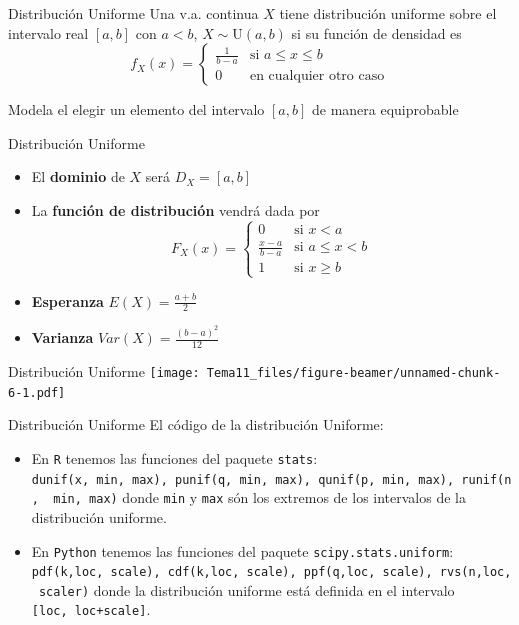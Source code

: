 \documentclass[
  ignorenonframetext,
]{beamer}
\providecommand{\tightlist}{%
  \setlength{\itemsep}{0pt}\setlength{\parskip}{0pt}}
\begin{document}
\begin{frame}{Distribución Uniforme}
\protect\hypertarget{distribuciuxf3n-uniforme}{}
Una v.a. continua \(X\) tiene distribución uniforme sobre el intervalo
real \([a,b]\) con \(a<b\), \(X\sim\text{U}(a,b)\) si su función de
densidad es \[f_X(x)=\left\{
\begin{array}{rl}
     \frac{1}{b-a} & \text{si } a\le x\le b
  \\ 0 & \text{en cualquier otro caso}
\end{array}
\right.\]

Modela el elegir un elemento del intervalo \([a,b]\) de manera
equiprobable
\end{frame}

\begin{frame}{Distribución Uniforme}
\protect\hypertarget{distribuciuxf3n-uniforme-1}{}
\begin{itemize}
\item
  El \textbf{dominio} de \(X\) será \(D_X = [a,b]\)
\item
  La \textbf{función de distribución} vendrá dada por \[F_X(x)=\left\{
  \begin{array}{rl}
    0 & \text{si } x<a
  \\ \frac{x-a}{b-a} & \text{si } a\le x< b
  \\ 1 & \text{si } x\ge b
  \end{array}
  \right.\]
\item
  \textbf{Esperanza} \(E(X) = \frac{a+b}{2}\)
\item
  \textbf{Varianza} \(Var(X) = \frac{(b-a)^2}{12}\)
\end{itemize}
\end{frame}

\begin{frame}{Distribución Uniforme}
\protect\hypertarget{distribuciuxf3n-uniforme-2}{}
\texttt{[image: Tema11\_files/figure-beamer/unnamed-chunk-6-1.pdf]}
\end{frame}

\begin{frame}[fragile]{Distribución Uniforme}
\protect\hypertarget{distribuciuxf3n-uniforme-3}{}
El código de la distribución Uniforme:

\begin{itemize}
\tightlist
\item
  En \texttt{R} tenemos las funciones del paquete \texttt{stats}:
  \texttt{dunif(x,\ min,\ max),\ punif(q,\ min,\ max),\ qunif(p,\ min,\ max),\ runif(n,\ \ min,\ max)}
  donde \texttt{min} y \texttt{max} són los extremos de los intervalos
  de la distribución uniforme.
\item
  En \texttt{Python} tenemos las funciones del paquete
  \texttt{scipy.stats.uniform}:
  \texttt{pdf(k,loc,\ scale),\ cdf(k,loc,\ scale),\ ppf(q,loc,\ scale),\ rvs(n,loc,\ scaler)}
  donde la distribución uniforme está definida en el intervalo
  \texttt{{[}loc,\ loc+scale{]}}.
\end{itemize}
\end{frame}
\end{document}
